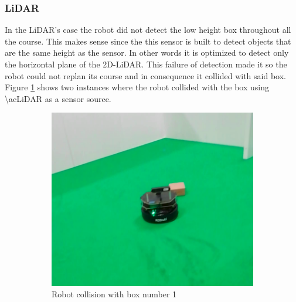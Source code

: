 \subsubsection*{LiDAR}
In the LiDAR's case the robot did not detect the low height box throughout all the course. This makes sense since the this sensor is built to detect objects that are the same height as the sensor. In other words it is optimized to detect only the horizontal plane of the 2D-\ac{LiDAR}. This failure of detection made it so the robot could not replan its course and in consequence it collided with said box. Figure \ref{fig::box} shows two instances where the robot collided with the box using \ac{\acLiDAR} as a sensor source.

\begin{figure}[h!]
  \centering
  \begin{subfigure}[b]{0.49\linewidth}
    \includegraphics[width=\linewidth]{imgs/chapter5/boxLF.png}
     \caption{Robot collision with box number 1}
     \label{fig::box}
  \end{subfigure}
  \begin{subfigure}[b]{0.47\linewidth}

\end{subfigure}
\end{figure}
